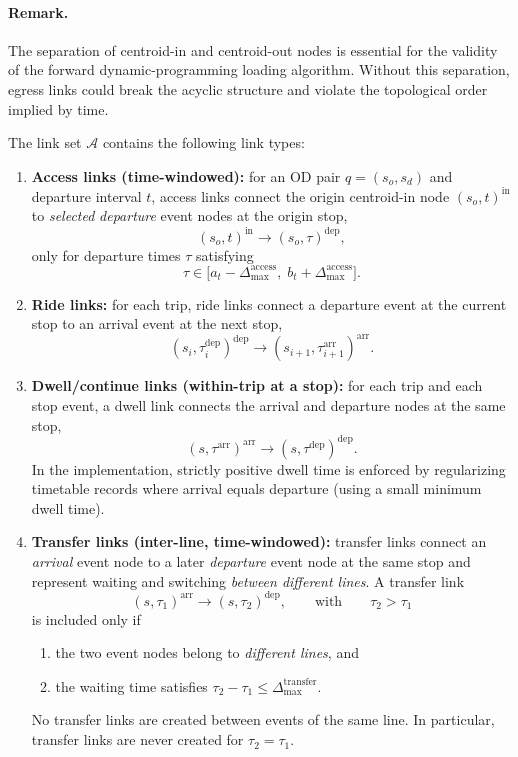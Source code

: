 \paragraph{Remark.}
The separation of centroid-in and centroid-out nodes is essential for the
validity of the forward dynamic-programming loading algorithm. Without
this separation, egress links could break the acyclic structure and violate the topological order implied by time.

\begin{definition}[Links]
The link set $\mathcal{A}$ contains the following link types:
\begin{enumerate}
\item \textbf{Access links (time-windowed):}
      for an OD pair $q=(s_o,s_d)$ and departure interval $t$, access links connect the
      origin centroid-in node $(s_o,t)^{\mathrm{in}}$ to \emph{selected}
      \emph{departure} event nodes at the origin stop,
      \[
      (s_o,t)^{\mathrm{in}} \rightarrow (s_o,\tau)^{\mathrm{dep}},
      \]
only for departure times $\tau$ satisfying
\[
\tau \in \bigl[a_t-\Delta_{\max}^{\mathrm{access}},\; b_t+\Delta_{\max}^{\mathrm{access}}\bigr].
\]

\item \textbf{Ride links:}
      for each trip, ride links connect a departure event at the current stop to an
      arrival event at the next stop,
      \[
      (s_i,\tau_i^{\mathrm{dep}})^{\mathrm{dep}} \rightarrow (s_{i+1},\tau_{i+1}^{\mathrm{arr}})^{\mathrm{arr}}.
      \]

\item \textbf{Dwell/continue links (within-trip at a stop):}
      for each trip and each stop event, a dwell link connects the arrival and departure
      nodes at the same stop,
      \[
      (s,\tau^{\mathrm{arr}})^{\mathrm{arr}} \rightarrow (s,\tau^{\mathrm{dep}})^{\mathrm{dep}}.
      \]
      In the implementation, strictly positive dwell time is enforced by regularizing
      timetable records where arrival equals departure (using a small minimum dwell time).

\item \textbf{Transfer links (inter-line, time-windowed):}
      transfer links connect an \emph{arrival} event node to a later \emph{departure} event node
      at the same stop and represent waiting and switching \emph{between different lines}. A transfer link
      \[
      (s,\tau_1)^{\mathrm{arr}} \rightarrow (s,\tau_2)^{\mathrm{dep}},
      \qquad\text{with}\qquad \tau_2>\tau_1
      \]
      is included only if
      \begin{enumerate}
      \item the two event nodes belong to \emph{different lines}, and
      \item the waiting time satisfies $\tau_2-\tau_1 \le \Delta_{\max}^{\mathrm{transfer}}$.
      \end{enumerate}
      No transfer links are created between events of the same line. In particular,
      transfer links are never created for $\tau_2=\tau_1$.


\end{enumerate}
\end{definition}
